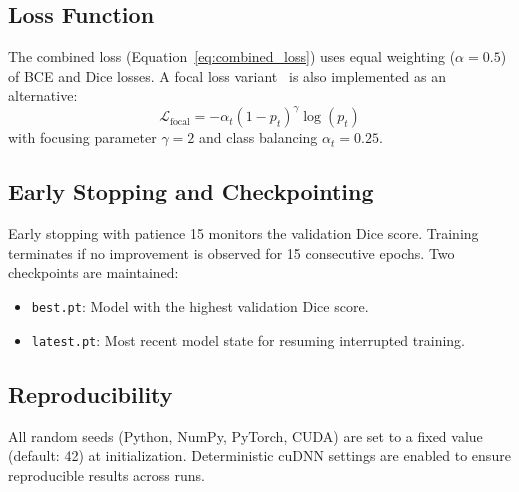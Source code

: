 \subsection{Loss Function}
\label{sec:impl:loss}

The combined loss (Equation~\ref{eq:combined_loss}) uses equal weighting ($\alpha = 0.5$) of \ac{BCE} and Dice losses. A focal loss variant~\cite{lin2017focal} is also implemented as an alternative:
\begin{equation}
	\mathcal{L}_{\text{focal}} = -\alpha_t (1 - p_t)^\gamma \log(p_t)
\end{equation}
with focusing parameter $\gamma = 2$ and class balancing $\alpha_t = 0.25$.

\subsection{Early Stopping and Checkpointing}
\label{sec:impl:earlystop}

Early stopping with patience 15 monitors the validation Dice score. Training terminates if no improvement is observed for 15 consecutive epochs. Two checkpoints are maintained:
\begin{itemize}
	\item \texttt{best.pt}: Model with the highest validation Dice score.
	\item \texttt{latest.pt}: Most recent model state for resuming interrupted training.
\end{itemize}

\subsection{Reproducibility}
\label{sec:impl:reproducibility}

All random seeds (Python, NumPy, PyTorch, CUDA) are set to a fixed value (default: 42) at initialization. Deterministic cuDNN settings are enabled to ensure reproducible results across runs.
